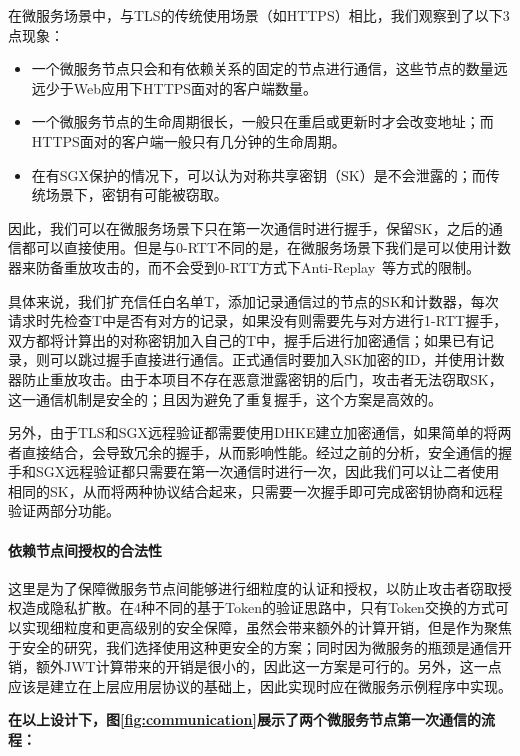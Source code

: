 在微服务场景中，与TLS的传统使用场景（如HTTPS）相比，我们观察到了以下3点现象：

\begin{itemize}
    \item 一个微服务节点只会和有依赖关系的固定的节点进行通信，这些节点的数量远远少于Web应用下HTTPS面对的客户端数量。
    \item 一个微服务节点的生命周期很长，一般只在重启或更新时才会改变地址；而HTTPS面对的客户端一般只有几分钟的生命周期。
    \item 在有SGX保护的情况下，可以认为对称共享密钥（SK）是不会泄露的；而传统场景下，密钥有可能被窃取。
\end{itemize}

因此，我们可以在微服务场景下只在第一次通信时进行握手，保留SK，之后的通信都可以直接使用。但是与0-RTT不同的是，在微服务场景下我们是可以使用计数器来防备重放攻击的，而不会受到0-RTT方式下Anti-Replay~\cite{8446}等方式的限制。

具体来说，我们扩充信任白名单T，添加记录通信过的节点的SK和计数器，每次请求时先检查T中是否有对方的记录，如果没有则需要先与对方进行1-RTT握手，双方都将计算出的对称密钥加入自己的T中，握手后进行加密通信；如果已有记录，则可以跳过握手直接进行通信。正式通信时要加入SK加密的ID，并使用计数器防止重放攻击。由于本项目不存在恶意泄露密钥的后门，攻击者无法窃取SK，这一通信机制是安全的；且因为避免了重复握手，这个方案是高效的。

另外，由于TLS和SGX远程验证都需要使用DHKE建立加密通信，如果简单的将两者直接结合，会导致冗余的握手，从而影响性能。经过之前的分析，安全通信的握手和SGX远程验证都只需要在第一次通信时进行一次，因此我们可以让二者使用相同的SK，从而将两种协议结合起来，只需要一次握手即可完成密钥协商和远程验证两部分功能。

\paragraph{依赖节点间授权的合法性}
这里是为了保障微服务节点间能够进行细粒度的认证和授权，以防止攻击者窃取授权造成隐私扩散。在4种不同的基于Token的验证思路中，只有Token交换的方式可以实现细粒度和更高级别的安全保障，虽然会带来额外的计算开销，但是作为聚焦于安全的研究，我们选择使用这种更安全的方案；同时因为微服务的瓶颈是通信开销，额外JWT计算带来的开销是很小的，因此这一方案是可行的。另外，这一点应该是建立在上层应用层协议的基础上，因此实现时应在微服务示例程序中实现。

\textbf{在以上设计下，图\ref{fig:communication}展示了两个微服务节点第一次通信的流程：}

